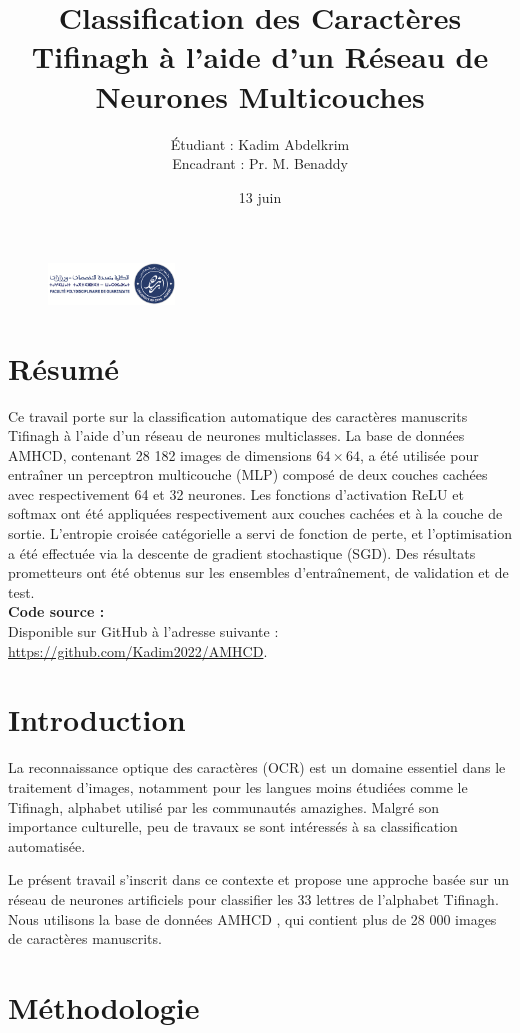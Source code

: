 \documentclass[12pt,a4paper]{article}
\title{Classification des Caractères Tifinagh à l’aide d’un Réseau de Neurones Multicouches}
\author{Étudiant : Kadim Abdelkrim \\ Encadrant : Pr. M. Benaddy}
\date{13 juin}
\begin{document}
	\begin{figure}
		\centering 
		\includegraphics[width=0.3\textwidth]{fpo.png} %
	\end{figure}
	\maketitle
	
	\section*{Résumé}
	Ce travail porte sur la classification automatique des caractères manuscrits Tifinagh à l’aide d’un réseau de neurones multiclasses. La base de données AMHCD, contenant 28 182 images de dimensions $64 \times 64$, a été utilisée pour entraîner un perceptron multicouche (MLP) composé de deux couches cachées avec respectivement 64 et 32 neurones. Les fonctions d’activation ReLU et softmax ont été appliquées respectivement aux couches cachées et à la couche de sortie. L’entropie croisée catégorielle a servi de fonction de perte, et l’optimisation a été effectuée via la descente de gradient stochastique (SGD). Des résultats prometteurs ont été obtenus sur les ensembles d'entraînement, de validation et de test.
	\\ \textbf{Code source :} \\Disponible sur GitHub à l'adresse suivante : \url{https://github.com/Kadim2022/AMHCD}. 
	
	\section{Introduction}
	La reconnaissance optique des caractères (OCR) est un domaine essentiel dans le traitement d’images, notamment pour les langues moins étudiées comme le Tifinagh, alphabet utilisé par les communautés amazighes. Malgré son importance culturelle, peu de travaux se sont intéressés à sa classification automatisée.
	
	Le présent travail s’inscrit dans ce contexte et propose une approche basée sur un réseau de neurones artificiels pour classifier les 33 lettres de l’alphabet Tifinagh. Nous utilisons la base de données AMHCD \cite{benaddy2020}, qui contient plus de 28 000 images de caractères manuscrits.
	
		\newpage
	\section{Méthodologie}
\end{document}
